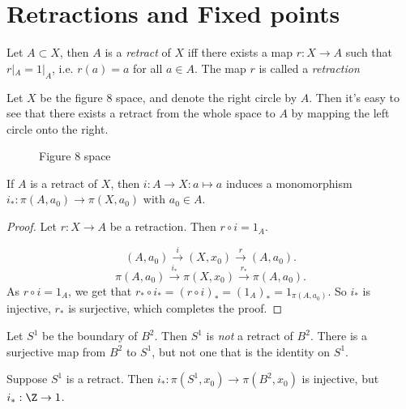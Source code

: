 
\setcounter{section}{54}
\section{Retractions and Fixed points}

\begin{definition}
    Let $A \subset X$, then $A$ is a \emph{retract} of $X$ iff there exists a map $r : X \to A$ such that $r|_A = 1|_A$, i.e.  $r(a) = a$ for all $a \in A$.
    The map $r$ is called a \emph{retraction}
\end{definition}
\begin{eg}
    Let $X$ be the figure $8$ space, and denote the right circle by $A$.
    Then it's easy to see that there exists a retract from the whole space to $A$ by mapping the left circle onto the right.
    \begin{figure}[H]
        \centering
        \caption{Figure 8 space}
        \label{fig:figure-8-space}
    \end{figure}
\end{eg}


\begin{lemma}[55.1]
    If $A$ is a retract of $X$, then $i: A \to X: a \mapsto a$ induces a monomorphism $i_*: \pi(A, a_0) \to \pi(X, a_0)$ with $a_0 \in A$.
\end{lemma}
\begin{proof}
    Let $r: X \to A$ be a retraction. Then $r \circ i = 1_A$.

    \[
        (A, a_0) \xrightarrow{i}  (X, x_0) \xrightarrow{r}  (A, a_0)
    .\] 
    \[
        \pi(A, a_0) \xrightarrow{i_*}  \pi(X, x_0) \xrightarrow{r_*}  \pi(A, a_0)
    .\] 
    As $r  \circ  i = 1_A$, we get that $r_*  \circ  i_* = (r  \circ  i)_* = (1_A)_* = 1_{\pi(A, a_0)}$.
    So $i_*$ is injective, $r_*$ is surjective, which completes the proof.
\end{proof}
\begin{eg}[Theorem 55.2]
    Let $S^1$ be the boundary of $B^2$.
    Then $S^1$ is \emph{not} a retract of $B^2$.
    There is a surjective map from $B^2$ to $S^1$, but not one that is the identity on $S^1$.
\end{eg}
\begin{explanation}
    Suppose $S^1$ is a retract. Then $i_*:\pi(S^1, x_0) \to \pi(B^2, x_0)$ is injective, but $i_*:\Z \to 1$. \hfill\contra
\end{explanation}

